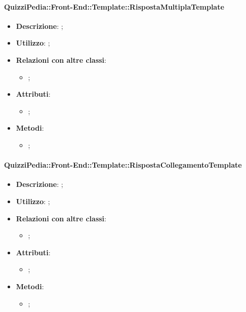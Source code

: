 		\paragraph{QuizziPedia::Front-End::Template::RispostaMultiplaTemplate}
			\begin{itemize}
				\item \textbf{Descrizione}: ;
				\item \textbf{Utilizzo}: ;
				\item \textbf{Relazioni con altre classi}: 
				\begin{itemize}
					\item ;
				\end{itemize}
				\item \textbf{Attributi}: 
				\begin{itemize}
					\item ;
				\end{itemize}
				\item \textbf{Metodi}: 
				\begin{itemize}
					\item ;
				\end{itemize}
			\end{itemize}
		
		\paragraph{QuizziPedia::Front-End::Template::RispostaCollegamentoTemplate}
			\begin{itemize}
				\item \textbf{Descrizione}: ;
				\item \textbf{Utilizzo}: ;
				\item \textbf{Relazioni con altre classi}: 
				\begin{itemize}
					\item ;
				\end{itemize}
				\item \textbf{Attributi}: 
				\begin{itemize}
					\item ;
				\end{itemize}
				\item \textbf{Metodi}: 
				\begin{itemize}
					\item ;
				\end{itemize}
			\end{itemize}
																					